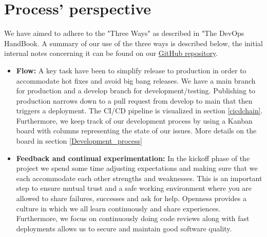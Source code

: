 \documentclass[10pt]{article}
\begin{document}
\section{Process' perspective}
We have aimed to adhere to the "Three Ways" as described in "The DevOps HandBook\cite{kim2021devops}. A summary of our use of the three ways is described below, the initial internal notes concerning it can be found on our \href{https://github.com/Arklaide/devopsITUproject/blob/main/report/sub-reports/ThreeWays.md}{GitHub repository}.
\begin{itemize}
    \item \textbf{Flow:} A key task have been to simplify release to production in order to accommodate hot fixes and avoid big bang releases. We have a main branch for production and a develop branch for development/testing. Publishing to production narrows down to a pull request from develop to main that then triggers a deployment. The CI/CD pipeline is visualized in section \ref{cicdchain}. Furthermore, we keep track of our development process by using a Kanban board with columns representing the state of our issues. More details on the board in section \ref{Development_process}
    \item\textbf{Feedback and continual experimentation: }In the kickoff phase of the project we spend some time adjusting expectations and making sure that we each accommodate each other strengths and weaknesses. This is an important step to ensure mutual trust and a safe working environment where you are allowed to share failures, successes and ask for help. Openness provides a culture in which we all learn continuously and share experiences. Furthermore, we focus on continuously doing code reviews along with fast deployments allows us to secure and maintain good software quality.
\end{itemize}
\end{document}
